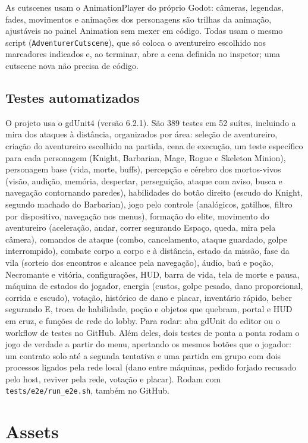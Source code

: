 \documentclass[11pt,a4paper]{article}
\begin{document}
As cutscenes usam o AnimationPlayer do próprio Godot: câmeras, legendas, fades, movimentos e animações dos personagens são trilhas da animação, ajustáveis no painel Animation sem mexer em código. Todas usam o mesmo script (\texttt{AdventurerCutscene}), que só coloca o aventureiro escolhido nos marcadores indicados e, ao terminar, abre a cena definida no inspetor; uma cutscene nova não precisa de código.

\subsection{Testes automatizados}

O projeto usa o gdUnit4 (versão 6.2.1). São 389 testes em 52 suítes, incluindo a mira dos ataques à distância, organizados por área: seleção de aventureiro, criação do aventureiro escolhido na partida, cena de execução, um teste específico para cada personagem (Knight, Barbarian, Mage, Rogue e Skeleton Minion), personagem base (vida, morte, buffs), percepção e cérebro dos mortos-vivos (visão, audição, memória, despertar, perseguição, ataque com aviso, busca e navegação contornando paredes), habilidades do botão direito (escudo do Knight, segundo machado do Barbarian), jogo pelo controle (analógicos, gatilhos, filtro por dispositivo, navegação nos menus), formação do elite, movimento do aventureiro (aceleração, andar, correr segurando Espaço, queda, mira pela câmera), comandos de ataque (combo, cancelamento, ataque guardado, golpe interrompido), combate corpo a corpo e à distância, estado da missão, fase da vila (sorteio dos encontros e alcance pela navegação), áudio, baú e poção, Necromante e vitória, configurações, HUD, barra de vida, tela de morte e pausa, máquina de estados do jogador, energia (custos, golpe pesado, dano proporcional, corrida e escudo), votação, histórico de dano e placar, inventário rápido, beber segurando E, troca de habilidade, poção e objetos que quebram, portal e HUD em cruz, e funções de rede do lobby. Para rodar: aba gdUnit do editor ou o workflow de testes no GitHub. Além deles, dois testes de ponta a ponta rodam o jogo de verdade a partir do menu, apertando os mesmos botões que o jogador: um contrato solo até a segunda tentativa e uma partida em grupo com dois processos ligados pela rede local (dano entre máquinas, pedido forjado recusado pelo host, reviver pela rede, votação e placar). Rodam com \texttt{tests/e2e/run\_e2e.sh}, também no GitHub.

\section{Assets}
\end{document}
